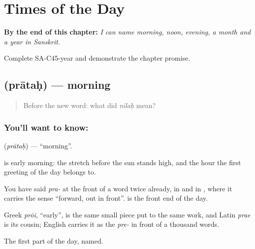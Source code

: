 
\chapter{Times of the Day}
\label{ch:sa-times-of-the-day}

\begin{chapteropening}
\textbf{By the end of this chapter:} \emph{I can name morning, noon, evening, a month and a year in Sanskrit.}

Complete SA-C45-year and demonstrate the chapter promise.
\end{chapteropening}

\section[\texorpdfstring{\sk{प्रातः} (prātaḥ)}{प्रातः (prātaḥ)}]{ (prātaḥ) — morning}

\label{lesson:SA-C45-morning}



\begin{quote}
Before the new word: what did \emph{nīlaḥ} mean?
\end{quote}

\subsection*{You'll want to know: }
\textbf{} (\emph{prātaḥ}) — \textquotedblleft{}morning\textquotedblright{}.

\textbf{} is early morning: the stretch before the sun stands high, and the hour the first greeting of the day belongs to.

You have said \emph{pra-} at the front of a word twice already, in \textbf{} and in \textbf{}, where it carries the sense \textquotedblleft{}forward, out in front\textquotedblright{}. \textbf{} is the front end of the day.

Greek \emph{prōi}, \textquotedblleft{}early\textquotedblright{}, is the same small piece put to the same work, and Latin \emph{prae} is its cousin; English carries it as the \emph{pre-} in front of a thousand words.

\begin{grammarlens}[title={What you've built}]
The first part of the day, named.
\end{grammarlens}

